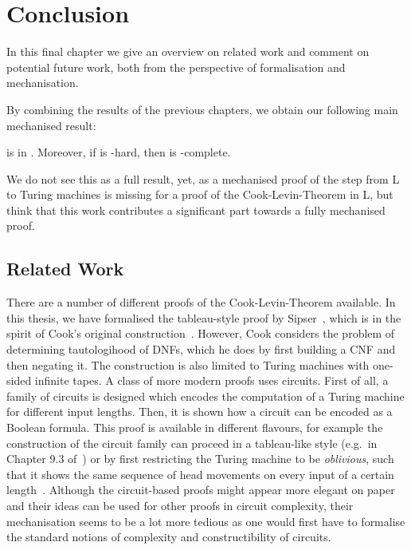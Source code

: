 \chapter{Conclusion}\label{chap:conclusion}
In this final chapter we give an overview on related work and comment on potential future work, both from the perspective of formalisation and mechanisation.

By combining the results of the previous chapters, we obtain our following main mechanised result:
\begin{theorem}
  \gennp{} is in \NP{}. Moreover, if \gennp{} is \NP{}-hard, then \SAT{} is \NP{}-complete.
\end{theorem}
We do not see this as a full result, yet, as a mechanised proof of the step from L to Turing machines is missing for a proof of the Cook-Levin-Theorem in L, but think that this work contributes a significant part towards a fully mechanised proof.

\section{Related Work}
There are a number of different proofs of the Cook-Levin-Theorem available. In this thesis, we have formalised the tableau-style proof by Sipser~\cite[Chapter~7.4]{Sipser:TheoryofComputation}, which is in the spirit of Cook's original construction~\cite{cook_theorem}. However, Cook considers the problem of determining tautologihood of DNFs, which he does by first building a CNF and then negating it. The construction is also limited to Turing machines with one-sided infinite tapes.
A class of more modern proofs uses circuits. First of all, a family of circuits is designed which encodes the computation of a Turing machine for different input lengths. Then, it is shown how a circuit can be encoded as a Boolean formula. This proof is available in different flavours, for example the construction of the circuit family can proceed in a tableau-like style (e.g.\ in Chapter 9.3 of~\cite{Sipser:TheoryofComputation}) or by first restricting the Turing machine to be \emph{oblivious}, such that it shows the same sequence of head movements on every input of a certain length~\cite[p.~199ff]{Bläser:TISkript}.
Although the circuit-based proofs might appear more elegant on paper and their ideas can be used for other proofs in circuit complexity, their mechanisation seems to be a lot more tedious as one would first have to formalise the standard notions of complexity and constructibility of circuits.

